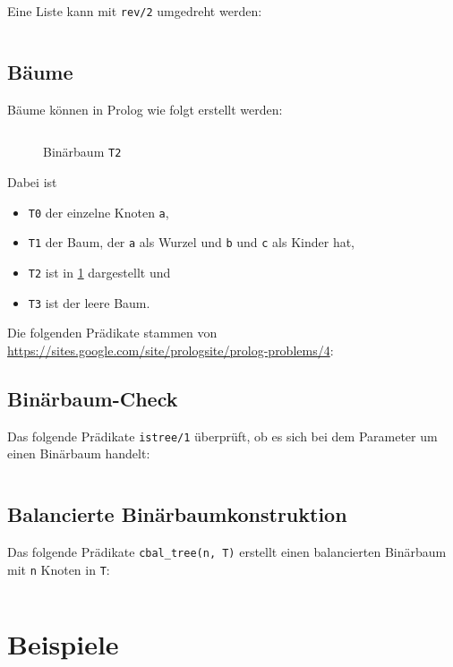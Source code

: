 Eine Liste kann mit \texttt{rev/2} umgedreht werden:
\inputminted[numbersep=5pt, tabsize=4]{prolog}{scripts/prolog/reverse-list.pl}

\subsection{Bäume}
Bäume können in Prolog wie folgt erstellt werden:

\inputminted[numbersep=5pt, tabsize=4]{prolog}{scripts/prolog/binary-tree-example.pl}

\begin{figure}[htp]
    \centering
     
    \caption{Binärbaum \texttt{T2}}
    \label{fig:binary-tree-t2}
\end{figure}

Dabei ist 
\begin{itemize}
    \item \texttt{T0} der einzelne Knoten \texttt{a},
    \item \texttt{T1} der Baum, der \texttt{a} als Wurzel und \texttt{b} und 
          \texttt{c} als Kinder hat,
    \item \texttt{T2} ist in \cref{fig:binary-tree-t2} dargestellt und
    \item \texttt{T3} ist der leere Baum.
\end{itemize}

Die folgenden Prädikate stammen von \url{https://sites.google.com/site/prologsite/prolog-problems/4}:

\subsection{Binärbaum-Check}
Das folgende Prädikate \texttt{istree/1} überprüft, ob es sich bei dem Parameter
um einen Binärbaum handelt:

\inputminted[numbersep=5pt, tabsize=4]{prolog}{scripts/prolog/istree.pl}

\subsection{Balancierte Binärbaumkonstruktion}
Das folgende Prädikate \texttt{cbal\_tree(n, T)} erstellt einen balancierten 
Binärbaum mit \texttt{n} Knoten in \texttt{T}:

\inputminted[numbersep=5pt, tabsize=4]{prolog}{scripts/prolog/balancedtreeconstruction.pl}

\section{Beispiele}
